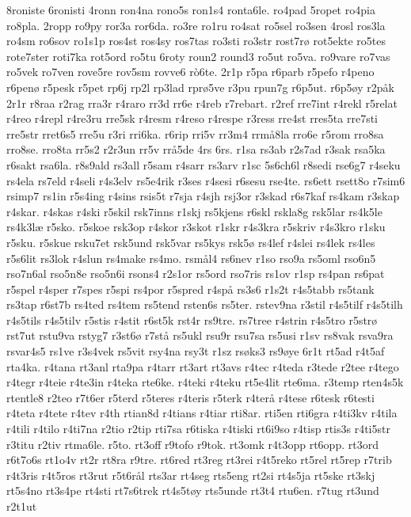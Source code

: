 {8roniste
6ronisti
4ronn
ron4na
rono5s
ron1s4
ronta6le.
ro4pad
5ropet
ro4pia
ro8pla.
2ropp
ro9py
ror3a
ror6da.
ro3re
ro1ru
ro4sat
ro5sel
ro3sen
4rosl
ros3la
ro4sm
ro6sov
ro1s1p
ros4st
ros4sy
ros7tas
ro3sti
ro3str
rost7rø
rot5ekte
ro5tes
rote7ster
roti7ka
rot5ord
ro5tu
6roty
roun2
round3
ro5ut
ro5va.
ro9vare
ro7vas
ro5vek
ro7ven
rove5re
rov5sm
rovve6
rò6te.
2r1p
r5pa
r6parb
r5pefo
r4peno
r6penø
r5pesk
r5pet
rp6j
rp2l
rp3lad
rprø5ve
r3pu
rpun7g
r6p5ut.
r6p5øy
r2påk
2r1r
r8raa
r2rag
rra3r
r4raro
rr3d
rr6e
r4reb
r7rebart.
r2ref
rre7int
r4rekl
r5relat
r4reo
r4repl
r4re3ru
rre5sk
r4resm
r4reso
r4respe
r3ress
rre4st
rres5ta
rre7sti
rre5str
rret6s5
rre5u
r3ri
rri6ka.
r6rip
rri5v
rr3m4
rrmå8la
rro6e
r5rom
rro8sa
rro8se.
rro8ta
rr5s2
r2r3un
rr5v
rrå5de
4rs
6rs.
r1sa
rs3ab
r2s7ad
r3sak
rsa5ka
r6sakt
rsa6la.
r8s9ald
rs3all
r5sam
r4sarr
rs3arv
r1sc
5s6ch6l
r8sedi
rse6g7
r4seku
rs4ela
rs7eld
r4seli
r4s3elv
rs5e4rik
r3ses
r4sesi
r6sesu
rse4te.
rs6ett
rsett8o
r7sim6
rsimp7
rs1in
r5s4ing
r4sins
rsis5t
r7sja
r4sjh
rsj3or
r3skad
r6s7kaf
rs4kam
r3skap
r4skar.
r4skas
r4ski
r5skil
rsk7inns
r1skj
rs5kjens
r6skl
rskla8g
rsk5lar
rs4k5le
rs4k3læ
r5sko.
r5skoe
rsk3op
r4skor
r3skot
r1skr
r4s3kra
r5skriv
r4s3kro
r1sku
r5sku.
r5skue
rsku7et
rsk5und
rsk5var
rs5kys
rsk5ø
rs4lef
r4slei
rs4lek
rs4les
r5s6lit
rs3lok
r4slun
rs4make
rs4mo.
rsmål4
rs6nev
r1so
rso9a
rs5oml
rso6n5
rso7n6al
rso5n8e
rso5n6i
rsons4
r2s1or
rs5ord
rso7ris
rs1ov
r1sp
rs4pan
rs6pat
r5spel
r4sper
r7spes
r5spi
rs4por
r5spred
r4spå
rs3s6
r1s2t
r4s5tabb
rs5tank
rs3tap
r6st7b
rs4ted
rs4tem
rs5tend
rsten6s
rs5ter.
rstev9na
r3stil
r4s5tilf
r4s5tilh
r4s5tils
r4s5tilv
r5stis
r4stit
r6st5k
rst4r
rs9tre.
rs7tree
r4strin
r4s5tro
r5strø
rst7ut
rstu9va
rstyg7
r3st6ø
r7stå
rs5ukl
rsu9r
rsu7sa
rs5usi
r1sv
rs8vak
rsva9ra
rsvar4s5
rs1ve
r3s4vek
rs5vit
rsy4na
rsy3t
r1sz
rsøks3
rs9øye
6r1t
rt5ad
r4t5af
rta4ka.
r4tana
rt3anl
rta9pa
r4tarr
rt3art
rt3avs
r4tec
r4teda
r3tede
r2tee
r4tego
r4tegr
r4teie
r4te3in
r4teka
rte6ke.
r4teki
r4teku
rt5e4lit
rte6ma.
r3temp
rten4s5k
rtentle8
r2teo
r7t6er
r5terd
r5teres
r4teris
r5terk
r4terå
r4tese
r6tesk
r6testi
r4teta
r4tete
r4tev
r4th
rtian8d
r4tians
r4tiar
rti8ar.
rti5en
rti6gra
r4ti3kv
r4tila
r4tili
r4tilo
r4ti7na
r2tio
r2tip
rti7sa
r6tiska
r4tiski
rt6i9so
r4tisp
rtis3s
r4ti5str
r3titu
r2tiv
rtma6le.
r5to.
rt3off
r9tofo
r9tok.
rt3omk
r4t3opp
rt6opp.
rt3ord
r6t7o6s
rt1o4v
rt2r
rt8ra
r9tre.
rt6red
rt3reg
rt3rei
r4t5reko
rt5rel
rt5rep
r7trib
r4t3ris
r4t5ros
rt3rut
r5t6rål
rts3ar
rt4seg
rts5eng
rt2si
rt4s5ja
rt5ske
rt3skj
rt5s4no
rt3s4pe
rt4sti
rt7s6trek
rt4s5tøy
rts5unde
rt3t4
rtu6en.
r7tug
rt3und
r2t1ut
}
